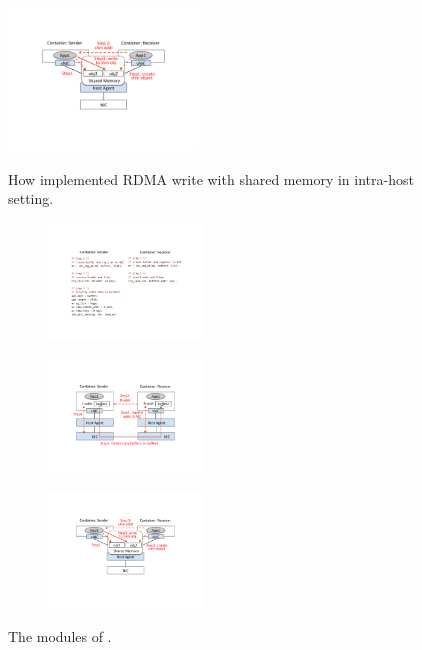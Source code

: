      \begin{figure}[ht]
     \centering 
     \includegraphics[width=0.45\textwidth]{figures/system/sys_rdma_shm.pdf}      
     \label{fig:sys_rdma_shm}
     \caption{How \sysname implemented RDMA write with shared memory in intra-host setting.} 
     \end{figure}
     
     \begin{figure}[ht]
     \centering 
     \begin{subfigure}
     \centering 
     \includegraphics[width=0.45\textwidth]{figures/system/sys_rdma_code.pdf}
     \end{subfigure}
           
     \begin{subfigure}
     \centering 
     \includegraphics[width=0.45\textwidth]{figures/system/sys_rdma_rdma.pdf}      
     \end{subfigure}
     
     \begin{subfigure}
     \centering
     \includegraphics[width=0.45\textwidth]{figures/system/sys_rdma_shm.pdf}      
     \end{subfigure}
     \label{fig:system_modules}
     \caption{The modules of \sysname.} 
     \end{figure}

